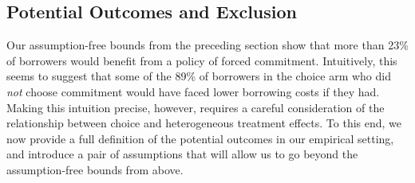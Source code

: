 \documentclass[oneside,11pt]{article}
\begin{document}


\subsection{Potential Outcomes and Exclusion}
\label{sec:potentialOutcomes}

Our assumption-free bounds from the preceding section show that more than 23\% of borrowers would benefit from a policy of forced commitment. 
Intuitively, this seems to suggest that some of the 89\% of borrowers in the choice arm who did \emph{not} choose commitment would have faced lower borrowing costs if they had.
Making this intuition precise, however, requires a careful consideration of the relationship between choice and heterogeneous treatment effects. 
To this end, we now provide a full definition of the potential outcomes in our empirical setting, and introduce a pair of assumptions that will allow us to go beyond the assumption-free bounds from above.
\end{document}
